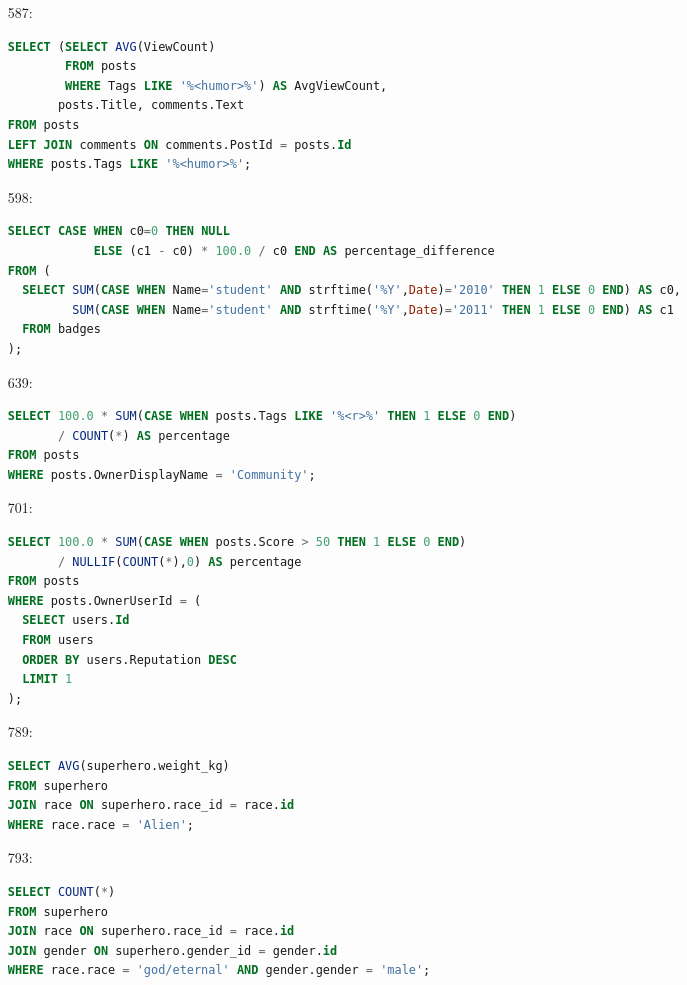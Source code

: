 \documentclass[11pt]{article}
\begin{document}
\begin{enumerate}
\item[587:]
\begin{lstlisting}[language=SQL]
SELECT (SELECT AVG(ViewCount)
        FROM posts
        WHERE Tags LIKE '%<humor>%') AS AvgViewCount,
       posts.Title, comments.Text
FROM posts
LEFT JOIN comments ON comments.PostId = posts.Id
WHERE posts.Tags LIKE '%<humor>%';
\end{lstlisting}

\item[598:]
\begin{adjustbox}{max width=\textwidth}
\begin{lstlisting}[language=SQL]
SELECT CASE WHEN c0=0 THEN NULL
            ELSE (c1 - c0) * 100.0 / c0 END AS percentage_difference
FROM (
  SELECT SUM(CASE WHEN Name='student' AND strftime('%Y',Date)='2010' THEN 1 ELSE 0 END) AS c0,
         SUM(CASE WHEN Name='student' AND strftime('%Y',Date)='2011' THEN 1 ELSE 0 END) AS c1
  FROM badges
);
\end{lstlisting}
\end{adjustbox}

\item[639:]
\begin{lstlisting}[language=SQL]
SELECT 100.0 * SUM(CASE WHEN posts.Tags LIKE '%<r>%' THEN 1 ELSE 0 END)
       / COUNT(*) AS percentage
FROM posts
WHERE posts.OwnerDisplayName = 'Community';
\end{lstlisting}

\item[701:]
\begin{lstlisting}[language=SQL]
SELECT 100.0 * SUM(CASE WHEN posts.Score > 50 THEN 1 ELSE 0 END)
       / NULLIF(COUNT(*),0) AS percentage
FROM posts
WHERE posts.OwnerUserId = (
  SELECT users.Id
  FROM users
  ORDER BY users.Reputation DESC
  LIMIT 1
);
\end{lstlisting}

\item[789:]
\begin{lstlisting}[language=SQL]
SELECT AVG(superhero.weight_kg)
FROM superhero
JOIN race ON superhero.race_id = race.id
WHERE race.race = 'Alien';
\end{lstlisting}

\item[793:]
\begin{lstlisting}[language=SQL]
SELECT COUNT(*)
FROM superhero
JOIN race ON superhero.race_id = race.id
JOIN gender ON superhero.gender_id = gender.id
WHERE race.race = 'god/eternal' AND gender.gender = 'male';
\end{lstlisting}


\end{enumerate}
\end{document}
